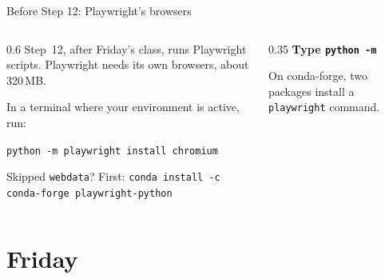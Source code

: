 \documentclass[9pt,aspectratio=169]{beamer}
\begin{document}
\begin{frame}{Before Step 12: Playwright's browsers}
    \begin{columns}[T]
        \begin{column}{0.6\textwidth}
            Step~12, after Friday's class, runs Playwright scripts. Playwright needs its own browsers, about 320\,MB.

            \medskip
            In a terminal where your environment is active, run:

            \medskip
            \texttt{python -m playwright install chromium}

            \medskip
            Skipped \texttt{webdata}? First: \texttt{conda install -c conda-forge playwright-python}
        \end{column}
        \begin{column}{0.35\textwidth}
            \textbf{Type \texttt{python -m}}\\[2pt]
            {\footnotesize On conda-forge, two packages install a \texttt{playwright} command.\par}
        \end{column}
    \end{columns}
\end{frame}

\newcommand{\statuslabel}[1]{\mbox{\texttt{status:\ #1}}}

\section{Friday}
\end{document}
